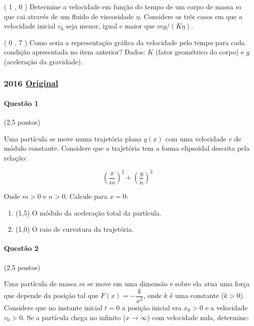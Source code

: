 \documentclass[12pt,a4paper]{article}
\newcommand{\original}[1]{\tiny \href{#1}{Original} \normalsize}
\begin{document}
\begin{tasks}

\task ( 1 , 0 ) Determine a velocidade em fun\c{c}\~ao do tempo de um corpo de massa $m$ que cai atrav\'es de um fluido de viscosidade $\eta$. Considere os tr\^es casos em que a velocidade inicial $v_0$ seja menor, igual e maior que $mg/(K\eta)$.

\task ( 0 , 7 ) Como seria a representa\c{c}\~ao gr\'afica da velocidade pelo tempo para cada condi\c{c}\~ao apresentada no item anterior? Dados: $K$ (fator geom\'etrico do corpo) e $g$ (acelera\c{c}\~ao da gravidade).

\end{tasks}

\newpage

\subsubsection{2016 \original{https://drive.google.com/file/d/1CWmNZs__Zg8e2EggOGfoaTazIz2uXSIU/view?usp=sharing}}

\paragraph{Questão 1} (2,5 pontos)

Uma partícula se move numa trajetória plana $y(x)$ com uma velocidade $v$ de módulo constante. Considere que a trajetória tem a forma elipsoidal descrita pela relação:

$$\left(\frac x m\right)^2+\left(\frac y n\right)^2$$

Onde $m>0$ e $n>0$. Calcule para $x=0$:

\begin{enumerate}[label=(\alph*)]

\item (1,5) O módulo da aceleração total da partícula.

\item (1,0) O raio de curvatura da trajetória.

\end{enumerate}

\paragraph{Questão 2} (2,5 pontos)

Uma partícula de massa $m$ se move em uma dimensão e sobre ela atua uma força que depende da posição tal que $F(x)=-\dfrac{k}{x^2}$, onde $k$ é uma constante ($k>0$). Considere que no instante inicial $t=0$ a posição inicial era $x_0>0$ e a velocidade $v_0>0$. Se a partícula chega no infinito ($x\to \infty$) com velocidade nula, determine:
\end{document}
